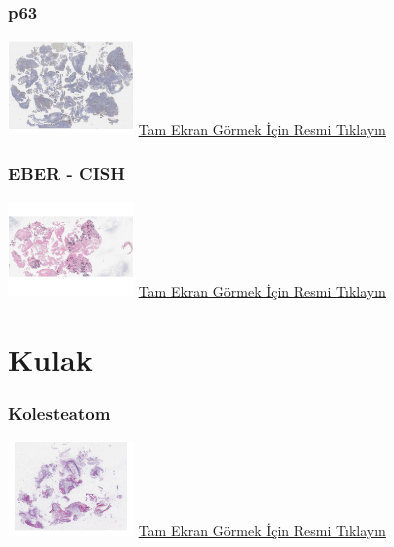 \documentclass[
  letterpaper,
  DIV=11,
  numbers=noendperiod]{scrreprt}
\begin{document}
\hypertarget{p63}{%
\subsection{p63}\label{p63}}

\href{https://images.patolojiatlasi.com/nasopharynx-nonkeratinizing-scc/p63.html}{\includegraphics[width=0.25\textwidth,height=\textheight]{./screenshots/thumbnail_nasopharynx-nonkeratinizing-scc-p63.png}}
\href{https://images.patolojiatlasi.com/nasopharynx-nonkeratinizing-scc/p63.html}{Tam
Ekran Görmek İçin Resmi Tıklayın}

\hypertarget{eber---cish}{%
\subsection{EBER - CISH}\label{eber---cish}}

\href{https://images.patolojiatlasi.com/nasopharynx-nonkeratinizing-scc/EBER.html}{\includegraphics[width=0.25\textwidth,height=\textheight]{./screenshots/thumbnail_nasopharynx-nonkeratinizing-scc-EBER.png}}
\href{https://images.patolojiatlasi.com/nasopharynx-nonkeratinizing-scc/EBER.html}{Tam
Ekran Görmek İçin Resmi Tıklayın}

\hypertarget{sec-kulak}{%
\chapter{Kulak}\label{sec-kulak}}

\hypertarget{sec-kolesteatom}{%
\subsection{Kolesteatom}\label{sec-kolesteatom}}

\href{https://images.patolojiatlasi.com/cholesteatoma/HE.html}{\includegraphics[width=0.25\textwidth,height=\textheight]{./screenshots/thumbnail_cholesteatoma.png}}
\href{https://images.patolojiatlasi.com/cholesteatoma/cholesteatoma.html}{Tam
Ekran Görmek İçin Resmi Tıklayın}
\end{document}

